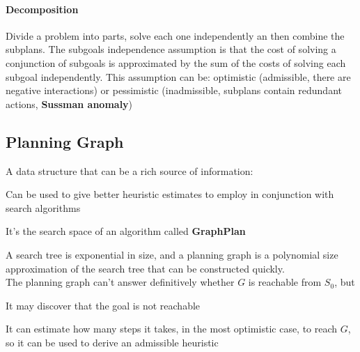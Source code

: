 \documentclass[10pt]{report}
\begin{document}
\paragraph{Decomposition} Divide a problem into parts, solve each one independently an then combine the subplans. The subgoals independence assumption is that the cost of solving a conjunction of subgoals is approximated by the sum of the costs of solving each subgoal independently. This assumption can be: optimistic (admissible, there are negative interactions) or pessimistic (inadmissible, subplans contain redundant actions, \textbf{Sussman anomaly})
\subsection{Planning Graph}
A data structure that can be a rich source of information:\begin{list}{}{}
	\item Can be used to give better heuristic estimates to employ in conjunction with search algorithms
	\item It's the search space of an algorithm called \textbf{GraphPlan}
\end{list}
A search tree is exponential in size, and a planning graph is a polynomial size approximation of the search tree that can be constructed quickly.\\
The planning graph can't answer definitively whether $G$ is reachable from $S_0$, but
\begin{list}{}{}
	\item It may discover that the goal is not reachable
	\item It can estimate how many steps it takes, in the most optimistic case, to reach $G$, so it can be used to derive an admissible heuristic
\end{list}
\end{document}
